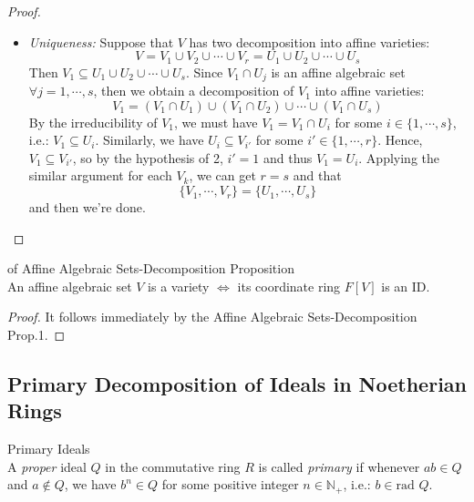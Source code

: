 \begin{proof}
\begin{enumerate}
\begin{itemize}
            \item \textit{Uniqueness:} Suppose that $V$ has two decomposition into affine varieties:
            $$V= V_1 \cup V_2 \cup \cdots \cup V_r= U_1 \cup U_2 \cup \cdots \cup U_s$$
            Then $V_1 \subseteq U_1 \cup U_2 \cup \cdots \cup U_s$. Since $V_1 \cap U_j$ is an affine algebraic set $\forall j=1 ,\cdots, s$, then we obtain a decomposition of $V_1$ into affine varieties:
            $$V_1= (V_1 \cap U_1) \cup (V_1 \cap U_2) \cup \cdots \cup (V_1 \cap U_s)$$
            By the irreducibility of $V_1$, we must have $V_1= V_1 \cap U_i$ for some $i \in \{ 1,\cdots, s\}$, i.e.: $V_1 \subseteq U_i$. Similarly, we have $U_i \subseteq V_{i'}$ for some $i' \in \{1,\cdots, r\}$. Hence, $V_1 \subseteq V_{i'}$, so by the hypothesis of 2, $i'=1$ and thus $V_1=U_i$. Applying the similar argument for each $V_k$, we can get $r=s$ and that
            $$\{ V_1 ,\cdots, V_r\} = \{U_1 ,\cdots, U_s\}$$
            and then we're done.
        \end{itemize}
    \end{enumerate}
\end{proof}


\begin{corollary}{of Affine Algebraic Sets-Decomposition Proposition}\\
An affine algebraic set $V$ is a variety $\Leftrightarrow$ its coordinate ring $F[V]$ is an ID.
\end{corollary}

\begin{proof}
    It follows immediately by the Affine Algebraic Sets-Decomposition Prop.1.
\end{proof}

\subsection{Primary Decomposition of Ideals in Noetherian Rings}

\begin{definition}{Primary Ideals}\\
A \textit{proper} ideal $Q$ in the commutative ring $R$ is called \textit{primary} if whenever $ab\in Q$ and $a \notin Q$, we have $b^n \in Q$ for some positive integer $n \in \mathbb{
N
}_+$, i.e.: $b \in \text{rad }Q$.
\end{definition}

